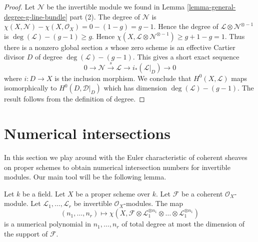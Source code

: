 \begin{proof}
Let $\mathcal{N}$ be the invertible module we found in
Lemma \ref{lemma-general-degree-g-line-bundle} part (2).
The degree of $\mathcal{N}$ is
$\chi(X, \mathcal{N}) - \chi(X, \mathcal{O}_X) = 0 - (1 - g) = g - 1$.
Hence the degree of $\mathcal{L} \otimes \mathcal{N}^{\otimes - 1}$
is $\deg(\mathcal{L}) - (g - 1) \geq g$.
Hence
$\chi(X, \mathcal{L} \otimes \mathcal{N}^{\otimes -1}) \geq g + 1 - g = 1$.
Thus there is a nonzero global section $s$ whose zero scheme is an
effective Cartier divisor $D$ of degree $\deg(\mathcal{L}) - (g - 1)$.
This gives a short exact sequence
$$
0 \to \mathcal{N} \xrightarrow{s} \mathcal{L} \to i_*(\mathcal{L}|_D) \to 0
$$
where $i : D \to X$ is the inclusion morphism. We conclude that
$H^0(X, \mathcal{L})$ maps isomorphically to $H^0(D, \mathcal{D}|_D)$
which has dimension $\deg(\mathcal{L}) - (g - 1)$. The result follows
from the definition of degree.
\end{proof}






\section{Numerical intersections}
\label{section-num}

\noindent
In this section we play around with the Euler characteristic of
coherent sheaves on proper schemes to obtain numerical intersection
numbers for invertible modules. Our main tool will be the following
lemma.

\begin{lemma}
\label{lemma-numerical-polynomial-from-euler}
Let $k$ be a field. Let $X$ be a proper scheme over $k$. Let $\mathcal{F}$
be a coherent $\mathcal{O}_X$-module. Let
$\mathcal{L}_1, \ldots, \mathcal{L}_r$ be invertible $\mathcal{O}_X$-modules.
The map
$$
(n_1, \ldots, n_r) \longmapsto
\chi(X, \mathcal{F} \otimes
\mathcal{L}_1^{\otimes n_1} \otimes \ldots \otimes
\mathcal{L}_1^{\otimes n_1})
$$
is a numerical polynomial in $n_1, \ldots, n_r$ of total degree at
most the dimension of the support of $\mathcal{F}$.
\end{lemma}

